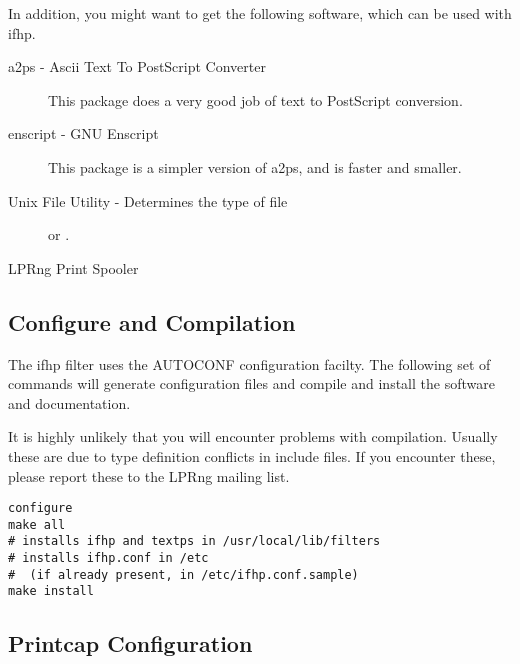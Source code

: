 \documentclass[a4paper]{article}
\begin{document}
In addition, you might want to get the following software,
which can be used with
{\ttfamily ifhp}.
\begin{description}
\item[a2ps - Ascii Text To PostScript Converter] \mbox{}

This package does a very good job of text to PostScript conversion.

\item[enscript - GNU Enscript] \mbox{}

This package is a simpler version of a2ps,
and is faster and smaller.

\item[Unix File Utility - Determines the type of file] \mbox{}

 or
.

\item[LPRng Print Spooler] \mbox{}


\end{description}



\subsection{Configure and Compilation}

The {\ttfamily ifhp} filter uses the AUTOCONF configuration facilty.
The following set of commands will generate configuration files
and compile and install the software and documentation.

It is highly unlikely that you will encounter problems with compilation.
Usually these are due to type definition conflicts in include files.
If you encounter these,
please report these to the LPRng mailing list.
\begin{tscreen}
\begin{verbatim}
configure
make all
# installs ifhp and textps in /usr/local/lib/filters
# installs ifhp.conf in /etc
#  (if already present, in /etc/ifhp.conf.sample)
make install
\end{verbatim}
\end{tscreen}



\subsection{Printcap Configuration}
\end{document}
